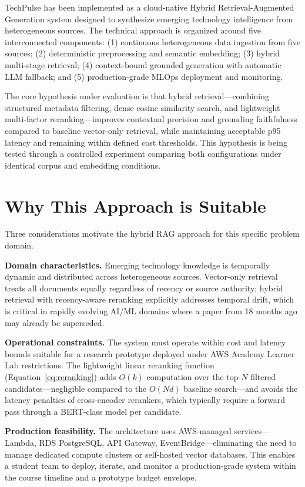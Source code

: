 \documentclass[12pt,a4paper]{report}
\begin{document}
TechPulse has been implemented as a cloud-native Hybrid Retrieval-Augmented Generation system designed to synthesize emerging technology intelligence from heterogeneous sources. The technical approach is organized around five interconnected components: (1) continuous heterogeneous data ingestion from five sources; (2) deterministic preprocessing and semantic embedding; (3) hybrid multi-stage retrieval; (4) context-bound grounded generation with automatic LLM fallback; and (5) production-grade MLOps deployment and monitoring.

The core hypothesis under evaluation is that hybrid retrieval---combining structured metadata filtering, dense cosine similarity search, and lightweight multi-factor reranking---improves contextual precision and grounding faithfulness compared to baseline vector-only retrieval, while maintaining acceptable p95 latency and remaining within defined cost thresholds. This hypothesis is being tested through a controlled experiment comparing both configurations under identical corpus and embedding conditions.

\section{Why This Approach is Suitable}
\label{sec:method_rationale}

Three considerations motivate the hybrid RAG approach for this specific problem domain.

\textbf{Domain characteristics.} Emerging technology knowledge is temporally dynamic and distributed across heterogeneous sources. Vector-only retrieval treats all documents equally regardless of recency or source authority; hybrid retrieval with recency-aware reranking explicitly addresses temporal drift, which is critical in rapidly evolving AI/ML domains where a paper from 18 months ago may already be superseded.

\textbf{Operational constraints.} The system must operate within cost and latency bounds suitable for a research prototype deployed under AWS Academy Learner Lab restrictions. The lightweight linear reranking function (Equation~\ref{eq:reranking}) adds $O(k)$ computation over the top-$N$ filtered candidates---negligible compared to the $O(Nd)$ baseline search---and avoids the latency penalties of cross-encoder rerankers, which typically require a forward pass through a BERT-class model per candidate.

\textbf{Production feasibility.} The architecture uses AWS-managed services---Lambda, RDS PostgreSQL, API Gateway, EventBridge---eliminating the need to manage dedicated compute clusters or self-hosted vector databases. This enables a student team to deploy, iterate, and monitor a production-grade system within the course timeline and a prototype budget envelope.
\end{document}
